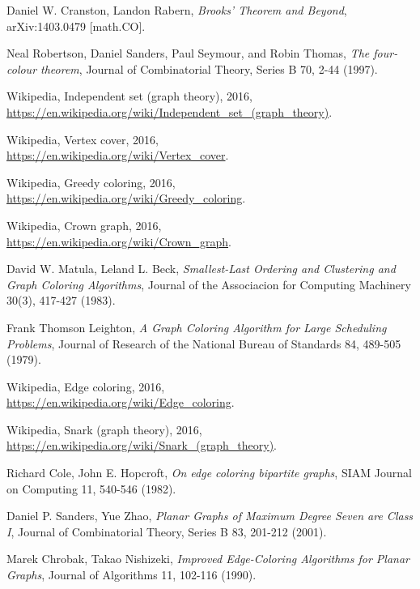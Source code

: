 \documentclass[12pt,a4paper]{mwrep}
\begin{document}
\begin{thebibliography}{99}
Daniel W. Cranston, Landon Rabern,
\emph{Brooks' Theorem and Beyond},
arXiv:1403.0479 [math.CO].

Neal Robertson, Daniel Sanders, Paul Seymour, and Robin Thomas,
\emph{The four-colour theorem},
Journal of Combinatorial Theory, Series B 70, 2-44 (1997).

Wikipedia, Independent set (graph theory), 2016,\\
\url{https://en.wikipedia.org/wiki/Independent_set_(graph_theory)}.

Wikipedia, Vertex cover, 2016,\\
\url{https://en.wikipedia.org/wiki/Vertex_cover}.

Wikipedia, Greedy coloring, 2016,\\
\url{https://en.wikipedia.org/wiki/Greedy_coloring}.

Wikipedia, Crown graph, 2016,\\
\url{https://en.wikipedia.org/wiki/Crown_graph}.

David W. Matula, Leland L. Beck,
\emph{Smallest-Last Ordering and Clustering and Graph Coloring Algorithms},
Journal of the Associacion for Computing Machinery 30(3), 417-427 (1983).

Frank Thomson Leighton,
\emph{A Graph Coloring Algorithm for Large Scheduling Problems},
Journal of Research of the National Bureau of Standards
84, 489-505 (1979).


Wikipedia, Edge coloring, 2016,\\
\url{https://en.wikipedia.org/wiki/Edge_coloring}.

Wikipedia, Snark (graph theory), 2016,\\
\url{https://en.wikipedia.org/wiki/Snark_(graph_theory)}.

Richard Cole, John E. Hopcroft,
\emph{On edge coloring bipartite graphs}, 
SIAM Journal on Computing 11, 540-546 (1982).

Daniel P. Sanders, Yue Zhao,
\emph{Planar Graphs of Maximum Degree Seven are Class I},
Journal of Combinatorial Theory, Series B 83, 201-212 (2001).

Marek Chrobak, Takao Nishizeki,
\emph{Improved Edge-Coloring Algorithms for Planar Graphs},
Journal of Algorithms 11, 102-116 (1990).


\end{thebibliography}
\end{document}
